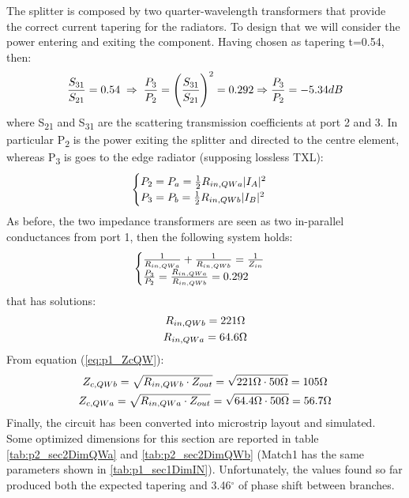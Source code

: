 The splitter is composed by two quarter-wavelength transformers that provide the correct current tapering for the radiators. To design that we will consider the power entering and exiting the component.
Having chosen as tapering t=0.54, then:
\begin{equation}
	\frac{S_{31}}{S_{21}}=0.54 \; \Rightarrow \; \frac{P_3}{P_2}=\Bigg(\frac{S_{31}}{S_{21}}\Bigg)^2=0.292 \Rightarrow \frac{P_3}{P_2}=-5.34dB \notag
\end{equation} 
where S\textsubscript{21} and S\textsubscript{31} are the scattering transmission coefficients at port 2 and 3. In particular P\textsubscript{2} is the power exiting the splitter and directed to the centre element, whereas P\textsubscript{3} is goes to the edge radiator (supposing lossless TXL):
\begin{equation}
	\begin{cases}
		P_2 = P_a = \frac{1}{2}R_{in,QWa}|I_A|^2 \notag \\	
		P_3 = P_b = \frac{1}{2}R_{in,QWb}|I_B|^2 \notag	
	\end{cases}	
\end{equation}
As before, the two impedance transformers are seen as two in-parallel conductances from port 1, then the following system holds: 
\begin{equation}
	\begin{cases} 
		\frac{1}{R_{in,QWa}}+\frac{1}{R_{in,QWb}}=\frac{1}{Z_{in}} \notag\\
		\frac{P_{3}}{P_{2}}=\frac{R_{in,QWa}}{R_{in,QWb}}=0.292 \notag
	\end{cases}
\end{equation}
that has solutions:
\begin{gather}
	R_{in,QWb} = 221\Omega \notag \\
	R_{in,QWa} = 64.6\Omega \notag
\end{gather}
From equation (\ref{eq:p1_ZcQW}):
\begin{gather}
	Z_{c,QWb}=\sqrt{R_{in,QWb}\cdot Z_{out}}=\sqrt{221\Omega \cdot 50\Omega}=105\Omega \notag \\
	Z_{c,QWa}=\sqrt{R_{in,QWa}\cdot Z_{out}}=\sqrt{64.4\Omega \cdot 50\Omega}=56.7\Omega \notag
\end{gather}
Finally, the circuit has been converted into microstrip layout and simulated. Some optimized dimensions for this section are reported in table \ref{tab:p2_sec2DimQWa} and \ref{tab:p2_sec2DimQWb} (Match1 has the same parameters shown in \ref{tab:p1_sec1DimIN}).
Unfortunately, the values found so far produced both the expected tapering  and 3.46$^\circ$ of phase shift between branches.
